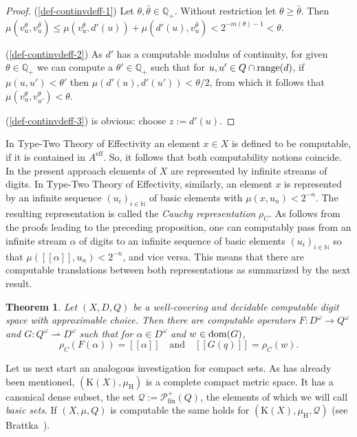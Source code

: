 \documentclass[microtype]{jloganal}
\theoremstyle{plain}
\newtheorem{theorem}{Theorem}[section]
\theoremstyle{definition}
\newcommand{\NN}{\mathbb{N}}
\newcommand{\QQ}{\mathbb{Q}}
\newcommand{\QQQ}{\mathcal{Q}}
\newcommand{\compact}{\mathrm{K}}
\newcommand{\hdm}{\mu_{\mathrm H}}
\newcommand{\val}[1]{[\![#1]\!]}
\newcommand{\fun}[3]{\mbox{$#1 \colon #2 \rightarrow #3$}}
\newcommand{\pfun}[3]{\mbox{$#1 \colon #2 \rightharpoonup #3$}}
\def\dom{\mathop{\mathstrut\rm dom}}
\def\range{\mathop{\mathstrut\rm range}}
\newcommand{\powfin}{\mathcal{P}^+_{\mathrm{fin}}}
\begin{document}
\begin{proof}
(\ref{def-continvdeff-1}) Let $\theta, \bar{\theta} \in \QQ_+$. Without restriction let $\theta \ge \bar{\theta}$. Then $\mu(v^{\theta}_u, v^{\bar{\theta}}_u) \le \mu(v^{\theta}_u, d'(u)) + \mu(d'(u), v^{\bar{\theta}}_u) < 2^{-m(\theta)-1} < \theta$.

(\ref{def-continvdeff-2}) As $d'$ has a computable modulus of continuity, for given $\theta \in \QQ_+$ we can compute a $\theta' \in \QQ_+$ such that for $u, u' \in Q \cap \range(d)$, if $\mu(u, u') < \theta'$ then $\mu(d'(u), d'(u')) < \theta/2$, from which it follows that
$\mu(v^{\theta}_u, v^{\theta}_{u'}) < \theta$. 


(\ref{def-continvdeff-3}) is obvious: choose $z := d'(u)$.
\end{proof}

In Type-Two Theory of Effectivity an element $x \in X$ is defined to be computable, if it is contained in $A^\text{eff}$. So, it follows that both computability notions coincide. In the present approach elements of $X$ are represented by infinite streams of digits. In Type-Two Theory of Effectivity, similarly, an element $x$ is represented by an infinite sequence $(u_i)_{i \in \NN}$ of basic elements with $\mu(x, u_n) < 2^{-n}$. The resulting representation is called the \emph{Cauchy representation} $\rho_C$. As follows from the proofs leading to the preceding proposition, one can computably pass from an infinite stream $\alpha$ of digits to an infinite sequence of basic elements $(u_i)_{i \in \NN}$ so that $\mu(\val{\alpha}, u_n) < 2^{-n}$, and vice versa. This means that there are computable translations between both representations as summarized by the next result.

\begin{theorem}
\label{thm-stream=cauchy}
Let $(X, D, Q)$ be a well-covering and decidable computable digit space with 
approximable choice. Then there are computable operators 
$\fun{F}{D^\omega}{Q^\omega}$ and $\pfun{G}{Q^\omega}{D^\omega}$ 
such that for $\alpha \in D^\omega$ and $w \in \dom(G)$, 
\[
\rho_C(F(\alpha)) = \val{\alpha} \quad\text{and}\quad \val{G(q)} = \rho_C(w).
\]
\end{theorem}

Let us next start an analogous investigation for compact sets. As has already been mentioned, $(\compact(X), \hdm)$ is a complete compact metric space. It has a canonical dense subset, the set $\QQQ := \powfin(Q)$, the elements of which we will call \emph{basic sets}. 
If $(X, \mu, Q)$ is computable the same holds for $(\compact(X), \hdm, \QQQ)$ (see Brattka~\cite{Brattka99}). 
\end{document}
